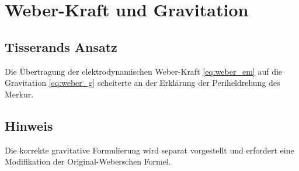 \section{Weber-Kraft und Gravitation}

\subsection*{Tisserands Ansatz}
Die Übertragung der elektrodynamischen Weber-Kraft \ref{eq:weber_em} auf die Gravitation \ref{eq:weber_g} scheiterte
an der Erklärung der Periheldrehung des Merkur.

\subsection*{Hinweis}
Die korrekte gravitative Formulierung wird separat vorgestellt und erfordert eine Modifikation der Original-Weberschen Formel.

